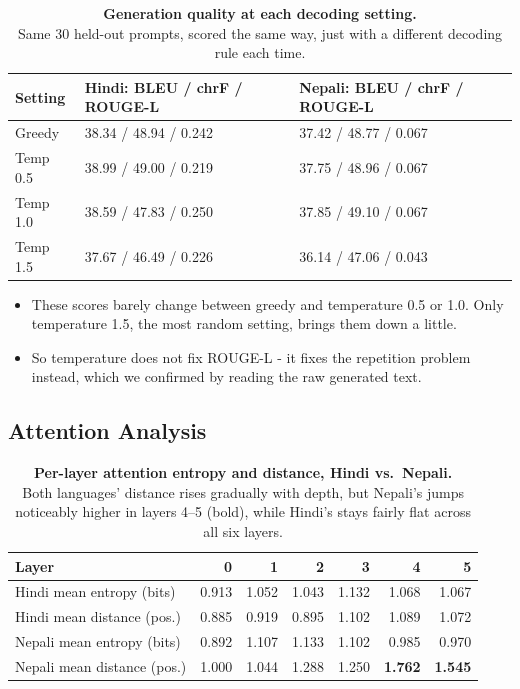 \documentclass[11pt]{article}
\newcommand{\figcap}[2]{\textbf{#1}\\[2pt]#2}
\begin{document}
\begin{table}[H]
\centering \small
\begin{tabular}{lll}
\toprule
Setting & Hindi: BLEU / chrF / ROUGE-L & Nepali: BLEU / chrF / ROUGE-L \\
\midrule
Greedy & 38.34 / 48.94 / 0.242 & 37.42 / 48.77 / 0.067 \\
Temp 0.5 & 38.99 / 49.00 / 0.219 & 37.75 / 48.96 / 0.067 \\
Temp 1.0 & 38.59 / 47.83 / 0.250 & 37.85 / 49.10 / 0.067 \\
Temp 1.5 & 37.67 / 46.49 / 0.226 & 36.14 / 47.06 / 0.043 \\
\bottomrule
\end{tabular}
\caption{\figcap{Generation quality at each decoding setting.}{Same 30 held-out prompts, scored the same way, just with a different decoding rule each time.}}
\end{table}

\begin{itemize}[leftmargin=1.3em, topsep=1pt, itemsep=1pt]
\item These scores barely change between greedy and temperature 0.5 or 1.0. Only temperature 1.5, the most random setting, brings them down a little.
\item So temperature does not fix ROUGE-L - it fixes the repetition problem instead, which we confirmed by reading the raw generated text.
\end{itemize}

\subsection{Attention Analysis}

\begin{table}[h]
\centering \small
\begin{tabular}{lrrrrrr}
\toprule
Layer & 0 & 1 & 2 & 3 & 4 & 5 \\
\midrule
Hindi mean entropy (bits) & 0.913 & 1.052 & 1.043 & 1.132 & 1.068 & 1.067 \\
Hindi mean distance (pos.) & 0.885 & 0.919 & 0.895 & 1.102 & 1.089 & 1.072 \\
Nepali mean entropy (bits) & 0.892 & 1.107 & 1.133 & 1.102 & 0.985 & 0.970 \\
Nepali mean distance (pos.) & 1.000 & 1.044 & 1.288 & 1.250 & \textbf{1.762} & \textbf{1.545} \\
\bottomrule
\end{tabular}
\caption{\figcap{Per-layer attention entropy and distance, Hindi vs.\ Nepali.}{Both languages' distance rises gradually with depth, but Nepali's jumps noticeably higher in layers 4--5 (bold), while Hindi's stays fairly flat across all six layers.}}
\end{table}
\end{document}
